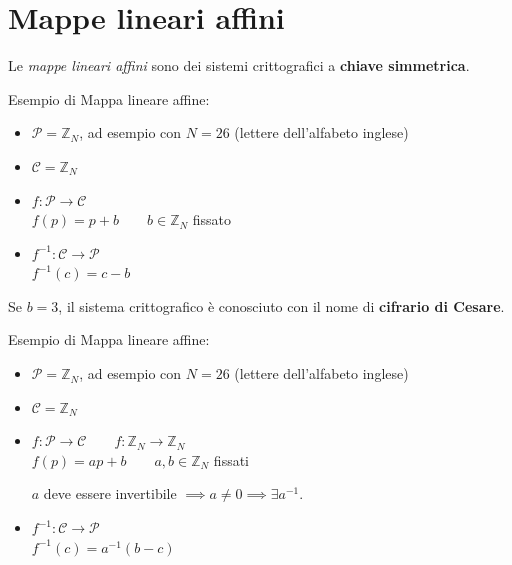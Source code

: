 \documentclass[a4paper,12pt, oneside]{book}
\begin{document}
\section{Mappe lineari affini}
Le \textit{mappe lineari affini} sono dei sistemi crittografici a \textbf{chiave simmetrica}.
\begin{esempio}
	Esempio di Mappa lineare affine:\\
	\begin{itemize}
		\item $\mathcal{P} = \mathbb{Z}_N$, ad esempio con $N = 26$ (lettere dell'alfabeto inglese)
		\item $\mathcal{C} = \mathbb{Z}_N$
		\item $f: \mathcal{P} \rightarrow \mathcal{C}$\\
		      $f(p) = p+b \qquad b \in \mathbb{Z}_N$ fissato
		\item $f^{-1}: \mathcal{C} \rightarrow \mathcal{P}$\\
		      $f^{-1}(c) = c-b$
	\end{itemize}
	\begin{nota}
		Se $b=3$, il sistema crittografico è conosciuto con il nome di \textbf{cifrario di Cesare}.
	\end{nota}
\end{esempio}
\begin{esempio}
	Esempio di Mappa lineare affine:\\
	\begin{itemize}
		\item $\mathcal{P} = \mathbb{Z}_N$, ad esempio con $N = 26$ (lettere dell'alfabeto inglese)
		\item $\mathcal{C} = \mathbb{Z}_N$
		\item $f: \mathcal{P} \rightarrow \mathcal{C} \qquad f: \mathbb{Z}_N \rightarrow \mathbb{Z}_N$\\
		      $f(p) = ap+b \qquad a,b \in \mathbb{Z}_N$ fissati
		      \begin{nota}
			      $a$ deve essere invertibile $\implies a \not = 0 \implies \exists a^{-1}$.
		      \end{nota}
		\item $f^{-1}: \mathcal{C} \rightarrow \mathcal{P}$\\
		      $f^{-1}(c) = a^{-1}(b-c)$
	\end{itemize}
\end{esempio}
\end{document}
